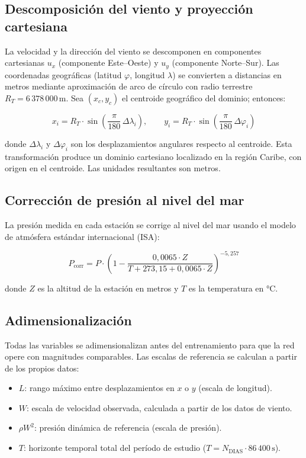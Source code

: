\subsection{Descomposición del viento y proyección cartesiana}

La velocidad y la dirección del viento se descomponen en componentes cartesianas $u_x$ (componente Este–Oeste) y $u_y$ (componente Norte–Sur). Las coordenadas geográficas (latitud $\varphi$, longitud $\lambda$) se convierten a distancias en metros mediante aproximación de arco de círculo con radio terrestre $R_T = 6\,378\,000\,\text{m}$. Sea $(x_c, y_c)$ el centroide geográfico del dominio; entonces:

\[
x_i = R_T \cdot \sin\left(\frac{\pi}{180}\,\Delta\lambda_i\right), \qquad y_i = R_T \cdot \sin\left(\frac{\pi}{180}\,\Delta\varphi_i\right)
\]

donde $\Delta\lambda_i$ y $\Delta\varphi_i$ son los desplazamientos angulares respecto al centroide. Esta transformación produce un dominio cartesiano localizado en la región Caribe, con origen en el centroide. Las unidades resultantes son metros.

\subsection{Corrección de presión al nivel del mar}

La presión medida en cada estación se corrige al nivel del mar usando el modelo de atmósfera estándar internacional (ISA):

\[
P_{\text{corr}} = P \cdot \left(1 - \frac{0{,}0065 \cdot Z}{T + 273{,}15 + 0{,}0065 \cdot Z}\right)^{-5{,}257}
\]

donde $Z$ es la altitud de la estación en metros y $T$ es la temperatura en °C.

\subsection{Adimensionalización}

Todas las variables se adimensionalizan antes del entrenamiento para que la red opere con magnitudes comparables. Las escalas de referencia se calculan a partir de los propios datos:

\begin{itemize}
	\item $L$: rango máximo entre desplazamientos en $x$ o $y$ (escala de longitud).
	\item $W$: escala de velocidad observada, calculada a partir de los datos de viento.
	\item $\rho W^2$: presión dinámica de referencia (escala de presión).
	\item $T$: horizonte temporal total del período de estudio ($T = N_{\text{DIAS}} \cdot 86\,400\,\text{s}$).
\end{itemize}

